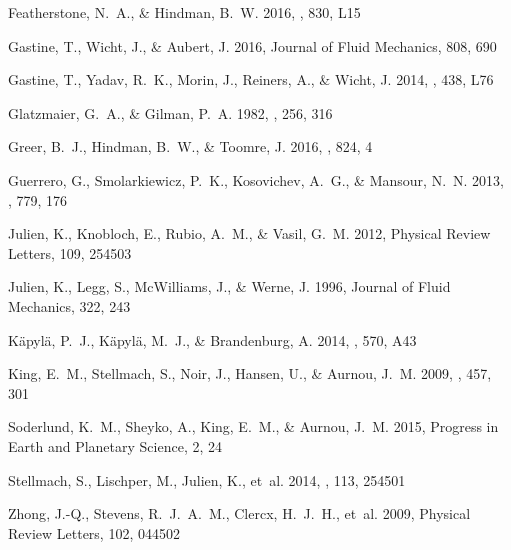 \documentclass[twocolumn, amsmath, amsfonts, amssymb]{aastex62}
\begin{document}
\begin{thebibliography}{}
{Featherstone}, N.~A., \& {Hindman}, B.~W. 2016, \apj, 830, L15

{Gastine}, T., {Wicht}, J., \& {Aubert}, J. 2016, Journal of Fluid Mechanics,
  808, 690

{Gastine}, T., {Yadav}, R.~K., {Morin}, J., {Reiners}, A., \& {Wicht}, J. 2014,
  \mnras, 438, L76

{Glatzmaier}, G.~A., \& {Gilman}, P.~A. 1982, \apj, 256, 316

{Greer}, B.~J., {Hindman}, B.~W., \& {Toomre}, J. 2016, \apj, 824, 4

{Guerrero}, G., {Smolarkiewicz}, P.~K., {Kosovichev}, A.~G., \& {Mansour},
  N.~N. 2013, \apj, 779, 176

{Julien}, K., {Knobloch}, E., {Rubio}, A.~M., \& {Vasil}, G.~M. 2012, Physical
  Review Letters, 109, 254503

{Julien}, K., {Legg}, S., {McWilliams}, J., \& {Werne}, J. 1996, Journal of
  Fluid Mechanics, 322, 243

{K{\"a}pyl{\"a}}, P.~J., {K{\"a}pyl{\"a}}, M.~J., \& {Brandenburg}, A. 2014,
  \aap, 570, A43

{King}, E.~M., {Stellmach}, S., {Noir}, J., {Hansen}, U., \& {Aurnou}, J.~M.
  2009, \nat, 457, 301

{Soderlund}, K.~M., {Sheyko}, A., {King}, E.~M., \& {Aurnou}, J.~M. 2015,
  Progress in Earth and Planetary Science, 2, 24

{Stellmach}, S., {Lischper}, M., {Julien}, K., {et~al.} 2014, \prl, 113, 254501

{Zhong}, J.-Q., {Stevens}, R.~J.~A.~M., {Clercx}, H.~J.~H., {et~al.} 2009,
  Physical Review Letters, 102, 044502

\end{thebibliography}
\end{document}
